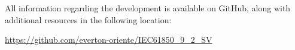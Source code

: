 All information regarding the development is available on GitHub, along with additional resources in the following location:

\hspace{1cm} \url{https://github.com/everton-oriente/IEC61850_9_2_SV}

